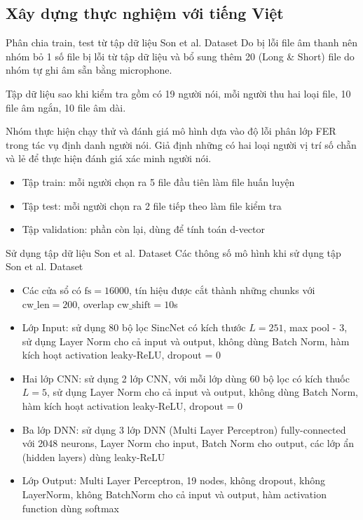 \documentclass[notheorems, aspectratio=54]{beamer}
\begin{document}
\subsection{Xây dựng thực nghiệm với \textbf{tiếng Việt}}
\begin{frame}{Phân chia train, test từ tập dữ liệu Son et al. Dataset}
	Do bị lỗi file âm thanh nên nhóm bỏ 1 số file bị lỗi từ tập dữ liệu và bổ sung thêm 20 (Long \& Short) file do nhóm tự ghi âm sẵn bằng microphone.
	
	Tập dữ liệu sao khi kiểm tra gồm có 19 người nói, mỗi người thu hai loại file, 10 file âm ngắn, 10 file âm dài.
	
	Nhóm thực hiện chạy thử và đánh giá mô hình dựa vào độ lỗi phân lớp FER trong tác vụ định danh người nói. Giả định những có hai loại người vị trí số chẵn và lẻ để thực hiện đánh giá xác minh người nói.
	\begin{itemize}
		\item Tập train: mỗi người chọn ra 5 file đầu tiên làm file huấn luyện
		\item Tập test: mỗi người chọn ra 2 file tiếp theo làm file kiểm tra
		\item Tập validation: phần còn lại, dùng để tính toán d-vector
	\end{itemize}

\end{frame}
\begin{frame}{Sử dụng tập dữ liệu Son et al. Dataset}
	Các thông số mô hình khi sử dụng tập Son et al. Dataset
	\begin{itemize}
		\item Các cửa sổ có $\text{fs} = 16000$, tín hiệu được cắt thành những chunks với $\text{cw\_len}=200$, overlap $\text{cw\_shift}=10$s
		\item Lớp Input: sử dụng 80 bộ lọc SincNet có kích thước $L=251$, max pool - 3, sử dụng Layer Norm cho cả input và output, không dùng Batch Norm, hàm kích hoạt activation leaky-ReLU, dropout = 0
		\item Hai lớp CNN: sử dụng 2 lớp CNN, với mỗi lớp dùng 60 bộ lọc có kích thuốc $L=5$, sử dụng Layer Norm cho cả input và output, không dùng Batch Norm, hàm kích hoạt activation leaky-ReLU, dropout = 0
		\item Ba lớp DNN: sử dụng 3 lớp DNN (Multi Layer Perceptron) fully-connected với 2048 neurons, Layer Norm cho input, Batch Norm cho output, các lớp ẩn (hidden layers) dùng leaky-ReLU
		\item Lớp Output: Multi Layer Perceptron, 19 nodes, không dropout, không LayerNorm, không BatchNorm cho cả input và output, hàm activation function dùng softmax
	\end{itemize}
\end{frame}
\end{document}
